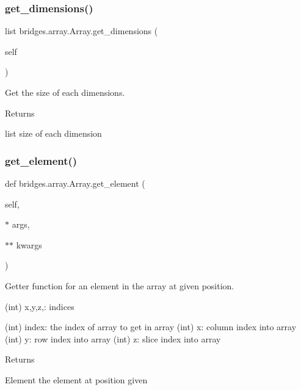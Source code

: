 \subsubsection{\texorpdfstring{get\_dimensions()}{get\_dimensions()}}
{\footnotesize\ttfamily  list bridges.\+array.\+Array.\+get\+\_\+dimensions (\begin{DoxyParamCaption}\item[{}]{self }\end{DoxyParamCaption})}



Get the size of each dimensions. 

\begin{DoxyReturn}{Returns}


list size of each dimension 
\end{DoxyReturn}
\mbox{\label{classbridges_1_1array_1_1_array_a2951a024fefc11202bc8036b2314bb42}} 
\subsubsection{\texorpdfstring{get\_element()}{get\_element()}}
{\footnotesize\ttfamily def bridges.\+array.\+Array.\+get\+\_\+element (\begin{DoxyParamCaption}\item[{}]{self,  }\item[{$\ast$}]{args,  }\item[{$\ast$$\ast$}]{kwargs }\end{DoxyParamCaption})}



Getter function for an element in the array at given position. 

\begin{DoxyVerb}       (int) x,y,z,: indices

       (int) index: the index of array to get in array
       (int) x: column index into array
       (int) y: row index into array
       (int) z: slice index into array
\end{DoxyVerb}
 \begin{DoxyReturn}{Returns}


Element the element at position given 
\end{DoxyReturn}
\mbox{\label{classbridges_1_1array_1_1_array_a4d7ea01781326e1b07a297f54ddcba2d}} 
